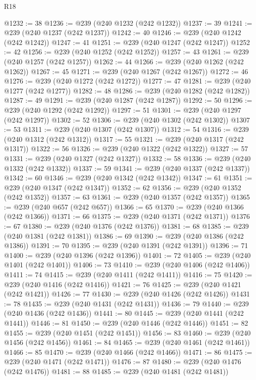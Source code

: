 \begin{lexlean}{R18}
\begin{coremodule}
@1232 := 38
@1236 := @239 (@240 @1232 (@242 @1232))
@1237 := 39
@1241 := @239 (@240 @1237 (@242 @1237))
@1242 := 40
@1246 := @239 (@240 @1242 (@242 @1242))
@1247 := 41
@1251 := @239 (@240 @1247 (@242 @1247))
@1252 := 42
@1256 := @239 (@240 @1252 (@242 @1252))
@1257 := 43
@1261 := @239 (@240 @1257 (@242 @1257))
@1262 := 44
@1266 := @239 (@240 @1262 (@242 @1262))
@1267 := 45
@1271 := @239 (@240 @1267 (@242 @1267))
@1272 := 46
@1276 := @239 (@240 @1272 (@242 @1272))
@1277 := 47
@1281 := @239 (@240 @1277 (@242 @1277))
@1282 := 48
@1286 := @239 (@240 @1282 (@242 @1282))
@1287 := 49
@1291 := @239 (@240 @1287 (@242 @1287))
@1292 := 50
@1296 := @239 (@240 @1292 (@242 @1292))
@1297 := 51
@1301 := @239 (@240 @1297 (@242 @1297))
@1302 := 52
@1306 := @239 (@240 @1302 (@242 @1302))
@1307 := 53
@1311 := @239 (@240 @1307 (@242 @1307))
@1312 := 54
@1316 := @239 (@240 @1312 (@242 @1312))
@1317 := 55
@1321 := @239 (@240 @1317 (@242 @1317))
@1322 := 56
@1326 := @239 (@240 @1322 (@242 @1322))
@1327 := 57
@1331 := @239 (@240 @1327 (@242 @1327))
@1332 := 58
@1336 := @239 (@240 @1332 (@242 @1332))
@1337 := 59
@1341 := @239 (@240 @1337 (@242 @1337))
@1342 := 60
@1346 := @239 (@240 @1342 (@242 @1342))
@1347 := 61
@1351 := @239 (@240 @1347 (@242 @1347))
@1352 := 62
@1356 := @239 (@240 @1352 (@242 @1352))
@1357 := 63
@1361 := @239 (@240 @1357 (@242 @1357))
@1365 := @239 (@240 @657 (@242 @657))
@1366 := 65
@1370 := @239 (@240 @1366 (@242 @1366))
@1371 := 66
@1375 := @239 (@240 @1371 (@242 @1371))
@1376 := 67
@1380 := @239 (@240 @1376 (@242 @1376))
@1381 := 68
@1385 := @239 (@240 @1381 (@242 @1381))
@1386 := 69
@1390 := @239 (@240 @1386 (@242 @1386))
@1391 := 70
@1395 := @239 (@240 @1391 (@242 @1391))
@1396 := 71
@1400 := @239 (@240 @1396 (@242 @1396))
@1401 := 72
@1405 := @239 (@240 @1401 (@242 @1401))
@1406 := 73
@1410 := @239 (@240 @1406 (@242 @1406))
@1411 := 74
@1415 := @239 (@240 @1411 (@242 @1411))
@1416 := 75
@1420 := @239 (@240 @1416 (@242 @1416))
@1421 := 76
@1425 := @239 (@240 @1421 (@242 @1421))
@1426 := 77
@1430 := @239 (@240 @1426 (@242 @1426))
@1431 := 78
@1435 := @239 (@240 @1431 (@242 @1431))
@1436 := 79
@1440 := @239 (@240 @1436 (@242 @1436))
@1441 := 80
@1445 := @239 (@240 @1441 (@242 @1441))
@1446 := 81
@1450 := @239 (@240 @1446 (@242 @1446))
@1451 := 82
@1455 := @239 (@240 @1451 (@242 @1451))
@1456 := 83
@1460 := @239 (@240 @1456 (@242 @1456))
@1461 := 84
@1465 := @239 (@240 @1461 (@242 @1461))
@1466 := 85
@1470 := @239 (@240 @1466 (@242 @1466))
@1471 := 86
@1475 := @239 (@240 @1471 (@242 @1471))
@1476 := 87
@1480 := @239 (@240 @1476 (@242 @1476))
@1481 := 88
@1485 := @239 (@240 @1481 (@242 @1481))

\end{coremodule}
\end{lexlean}
